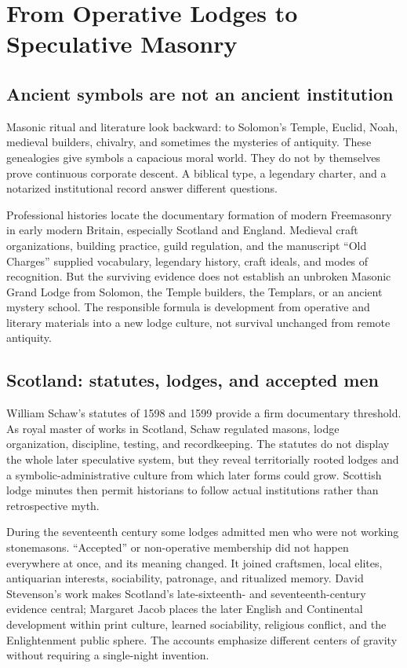\section{From Operative Lodges to Speculative Masonry}

\subsection{Ancient symbols are not an ancient institution}

Masonic ritual and literature look backward: to Solomon's Temple, Euclid, Noah, medieval builders, chivalry, and sometimes the mysteries of antiquity. These genealogies give symbols a capacious moral world. They do not by themselves prove continuous corporate descent. A biblical type, a legendary charter, and a notarized institutional record answer different questions.

Professional histories locate the documentary formation of modern Freemasonry in early modern Britain, especially Scotland and England. Medieval craft organizations, building practice, guild regulation, and the manuscript “Old Charges” supplied vocabulary, legendary history, craft ideals, and modes of recognition. But the surviving evidence does not establish an unbroken Masonic Grand Lodge from Solomon, the Temple builders, the Templars, or an ancient mystery school. The responsible formula is development from operative and literary materials into a new lodge culture, not survival unchanged from remote antiquity.

\subsection{Scotland: statutes, lodges, and accepted men}

William Schaw's statutes of 1598 and 1599 provide a firm documentary threshold. As royal master of works in Scotland, Schaw regulated masons, lodge organization, discipline, testing, and recordkeeping. The statutes do not display the whole later speculative system, but they reveal territorially rooted lodges and a symbolic-administrative culture from which later forms could grow. Scottish lodge minutes then permit historians to follow actual institutions rather than retrospective myth.

During the seventeenth century some lodges admitted men who were not working stonemasons. “Accepted” or non-operative membership did not happen everywhere at once, and its meaning changed. It joined craftsmen, local elites, antiquarian interests, sociability, patronage, and ritualized memory. David Stevenson's work makes Scotland's late-sixteenth- and seventeenth-century evidence central; Margaret Jacob places the later English and Continental development within print culture, learned sociability, religious conflict, and the Enlightenment public sphere. The accounts emphasize different centers of gravity without requiring a single-night invention.

